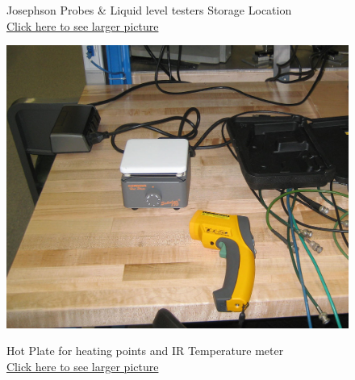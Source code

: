 \documentclass{../lab}
\begin{document}
\begin{figure}[!htb]
  \caption{Josephson Probes \& Liquid level testers Storage Location \\ \href{http://experimentationlab.berkeley.edu/sites/default/files/images/JOS-Probes_3506.jpg}{Click here to see larger picture}}\label{fig:JOS-Probes_3506.jpg}
\endminipage\hfill
{}
  \href{http://experimentationlab.berkeley.edu/sites/default/files/images/HotPlate-JOS_3505-Lg.jpg}{\includegraphics[width=\linewidth,keepaspectratio]{images/HotPlate-JOS_3505-Lg.jpg}}
  \caption{Hot Plate for heating points and IR Temperature meter \\ \href{http://experimentationlab.berkeley.edu/sites/default/files/images/HotPlate-JOS_3505-Lg.jpg}{Click here to see larger picture}}\label{fig:HotPlate-JOS_3505-Lg.jpg}
\endminipage\hfill
{}

\end{figure}
\end{document}
